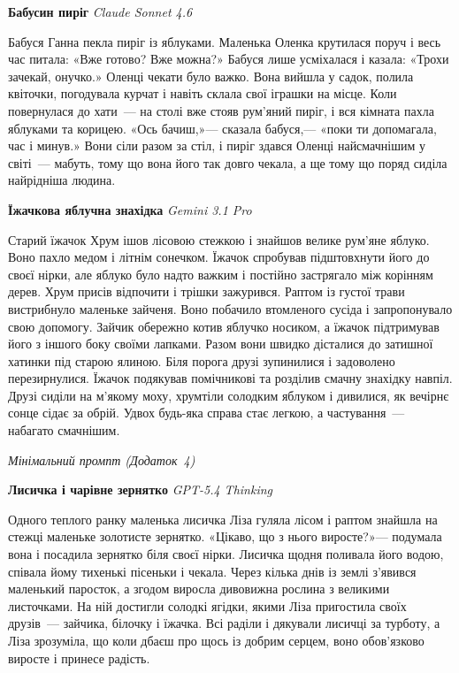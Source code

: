 \documentclass[14pt, a4paper]{extreport}
\begin{document}
\vspace{14pt}
\textbf{Бабусин пиріг} \hfill\textit{Claude Sonnet 4.6}

\medskip
Бабуся Ганна пекла пиріг із яблуками. Маленька Оленка крутилася поруч і весь час питала: «Вже готово? Вже можна?» Бабуся лише усміхалася і казала: «Трохи зачекай, онучко.» Оленці чекати було важко. Вона вийшла у садок, полила квіточки, погодувала курчат і навіть склала свої іграшки на місце. Коли повернулася до хати~--- на столі вже стояв рум'яний пиріг, і вся кімната пахла яблуками та корицею. «Ось бачиш,»--- сказала бабуся,--- «поки ти допомагала, час і минув.» Вони сіли разом за стіл, і пиріг здався Оленці найсмачнішим у світі~--- мабуть, тому що вона його так довго чекала, а ще тому що поряд сиділа найрідніша людина.

\vspace{14pt}
\textbf{Їжачкова яблучна знахідка} \hfill\textit{Gemini 3.1 Pro}

\medskip
Старий їжачок Хрум ішов лісовою стежкою і знайшов велике рум'яне яблуко. Воно пахло медом і літнім сонечком. Їжачок спробував підштовхнути його до своєї нірки, але яблуко було надто важким і постійно застрягало між корінням дерев. Хрум присів відпочити і трішки зажурився. Раптом із густої трави вистрибнуло маленьке зайченя. Воно побачило втомленого сусіда і запропонувало свою допомогу. Зайчик обережно котив яблучко носиком, а їжачок підтримував його з іншого боку своїми лапками. Разом вони швидко дісталися до затишної хатинки під старою ялиною. Біля порога друзі зупинилися і задоволено перезирнулися. Їжачок подякував помічникові та розділив смачну знахідку навпіл. Друзі сиділи на м'якому моху, хрумтіли солодким яблуком і дивилися, як вечірнє сонце сідає за обрій. Удвох будь-яка справа стає легкою, а частування~--- набагато смачнішим.

\vspace{20pt}
\begin{center}\textit{Мінімальний промпт (Додаток~4)}\end{center}
\vspace{6pt}

\textbf{Лисичка і чарівне зернятко} \hfill\textit{GPT-5.4 Thinking}

\medskip
Одного теплого ранку маленька лисичка Ліза гуляла лісом і раптом знайшла на стежці маленьке золотисте зернятко. «Цікаво, що з нього виросте?»--- подумала вона і посадила зернятко біля своєї нірки. Лисичка щодня поливала його водою, співала йому тихенькі пісеньки і чекала. Через кілька днів із землі з'явився маленький паросток, а згодом виросла дивовижна рослина з великими листочками. На ній достигли солодкі ягідки, якими Ліза пригостила своїх друзів~--- зайчика, білочку і їжачка. Всі раділи і дякували лисичці за турботу, а Ліза зрозуміла, що коли дбаєш про щось із добрим серцем, воно обов'язково виросте і принесе радість.
\end{document}
